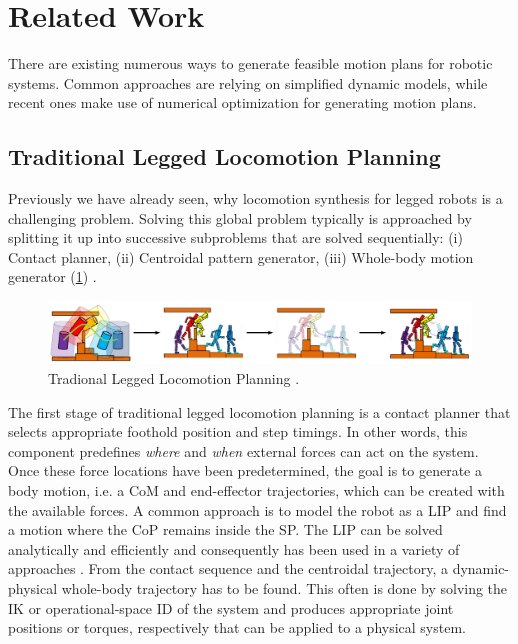 \section{Related Work}
There are existing numerous ways to generate feasible motion plans for robotic systems. Common approaches are relying on simplified dynamic models, while recent ones make use of numerical optimization for generating motion plans. 

\subsection{Traditional Legged Locomotion Planning}
Previously we have already seen, why locomotion synthesis for legged robots is a challenging problem. Solving this global problem typically is approached by splitting it up into successive subproblems that are solved sequentially: (i) Contact planner, (ii) Centroidal pattern generator, (iii) Whole-body motion generator (\cref{img:traditional_locomotion_planner}) \cite{carpentier2017multi}. 
\begin{figure}[h!]
\centering	
\includegraphics[width=1\textwidth]{img/traditional_locomotion_planner.jpg}
\caption{Tradional Legged Locomotion Planning \cite{giraud2020motion}.}
\label{img:traditional_locomotion_planner}
\end{figure}  
The first stage of traditional legged locomotion planning is a contact planner that selects appropriate foothold position and step timings. In other words, this component predefines \textit{where} and \textit{when} external forces can act on the system. 
Once these force locations have been predetermined, the goal is to generate a body motion, i.e. a \gls{CoM} and end-effector trajectories, which can be created with the available forces. A common approach is to model the robot as a \gls{LIP} and find a motion where the \gls{CoP} remains inside the \gls{SP}. The \gls{LIP} can be solved analytically and efficiently and consequently has been used in a variety of approaches \cite{kajita2003biped, kalakrishnan2010fast, winkler2015planning, bellicoso2017dynamic}. 
From the contact sequence and the centroidal trajectory, a dynamic-physical whole-body trajectory has to be found. This often is done by solving the \gls{IK} \cite{espiau1992new} or operational-space \gls{ID} \cite{khatib1987unified} of the system and produces appropriate joint positions or torques, respectively that can be applied to a physical system.

